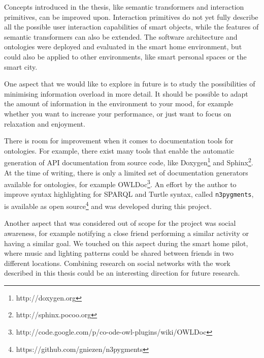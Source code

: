 Concepts introduced in the thesis, like semantic transformers and interaction primitives, can be improved upon. Interaction primitives do not yet fully describe all the possible user interaction capabilities of smart objects, while the features of semantic transformers can also be extended. The software architecture and ontologies were deployed and evaluated in the smart home environment, but could also be applied to other environments, like smart personal spaces or the smart city.

One aspect that we would like to explore in future is to study the possibilities of minimising information overload in more detail. It should be possible to adapt the amount of information in the environment to your mood, for example whether you want to increase your performance, or just want to focus on relaxation and enjoyment.


There is room for improvement when it comes to documentation tools for ontologies. For example, there exist many tools that enable the automatic generation of \ac{API} documentation from source code, like Doxygen\footnote{http://doxygen.org} and Sphinx\footnote{http://sphinx.pocoo.org}. At the time of writing, there is only a limited set of documentation generators available for ontologies, for example OWLDoc\footnote{http://code.google.com/p/co-ode-owl-plugins/wiki/OWLDoc}. An effort by the author to improve syntax highlighting for \ac{SPARQL} and Turtle syntax, called \texttt{n3pygments}, is available as open source\footnote{https://github.com/gniezen/n3pygments} and was developed during this project.


Another aspect that was considered out of scope for the project was social awareness, for example notifying a close friend performing a similar activity or having a similar goal. We touched on this aspect during the smart home pilot, where music and lighting patterns could be shared between friends in two different locations. Combining research on social networks with the work described in this thesis could be an interesting direction for future research.

